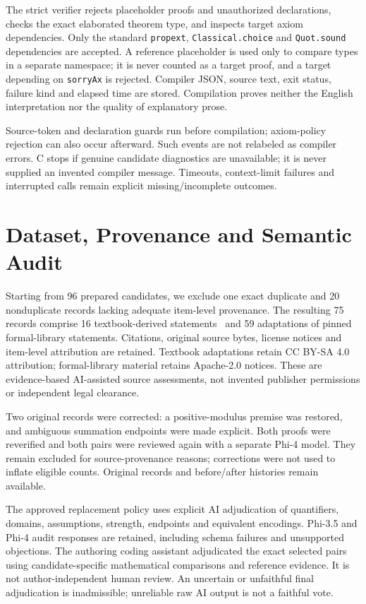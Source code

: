 \documentclass[runningheads,a4paper]{llncs}
\begin{document}
The strict verifier rejects placeholder proofs and unauthorized declarations,
checks the exact elaborated theorem type, and inspects target axiom dependencies.
Only the standard \texttt{propext}, \texttt{Classical.choice} and
\texttt{Quot.sound} dependencies are accepted. A reference placeholder is used
only to compare types in a separate namespace; it is never counted as a target
proof, and a target depending on \texttt{sorryAx} is rejected. Compiler JSON,
source text, exit status, failure kind and elapsed time are stored. Compilation
proves neither the English interpretation nor the quality of explanatory prose.

Source-token and declaration guards run before compilation; axiom-policy
rejection can also occur afterward. Such events are not relabeled as compiler
errors. C stops if genuine candidate diagnostics are unavailable;
it is never supplied an invented compiler message. Timeouts, context-limit
failures and interrupted calls remain explicit missing/incomplete outcomes.

\section{Dataset, Provenance and Semantic Audit}
Starting from 96 prepared candidates, we exclude one exact duplicate and 20
nonduplicate records lacking adequate item-level provenance. The resulting 75
records comprise 16 textbook-derived statements~\cite{levin2021dmoi} and 59
adaptations of pinned formal-library statements. Citations, original source
bytes, license notices and item-level attribution are retained. Textbook
adaptations retain CC BY-SA 4.0 attribution; formal-library material retains
Apache-2.0 notices. These are evidence-based AI-assisted source assessments,
not invented publisher permissions or independent legal clearance.

Two original records were corrected: a positive-modulus premise was restored,
and ambiguous summation endpoints were made explicit. Both proofs were
reverified and both pairs were reviewed again with a separate Phi-4 model.
They remain excluded for source-provenance reasons; corrections were not used
to inflate eligible counts. Original records and before/after histories remain
available.



The approved replacement policy uses explicit AI adjudication of quantifiers,
domains, assumptions, strength, endpoints and equivalent encodings. Phi-3.5 and
Phi-4 audit responses are retained, including schema failures and unsupported
objections. The authoring coding assistant adjudicated the exact selected pairs
using candidate-specific mathematical comparisons and reference evidence. It
is not author-independent human review. An uncertain or unfaithful final
adjudication is inadmissible; unreliable raw AI output is not a faithful vote.
\end{document}
